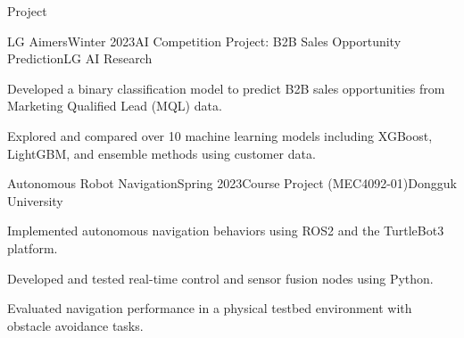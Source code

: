 \begin{rSection}{Project}

\begin{rSubsection}{LG Aimers}{Winter 2023}{AI Competition Project: B2B Sales Opportunity Prediction}{LG AI Research}
  \item Developed a binary classification model to predict B2B sales opportunities from Marketing Qualified Lead (MQL) data.
  \item Explored and compared over 10 machine learning models including XGBoost, LightGBM, and ensemble methods using customer data.
\end{rSubsection}

\begin{rSubsection}{Autonomous Robot Navigation}{Spring 2023}{Course Project (MEC4092-01)}{Dongguk University}
  \item Implemented autonomous navigation behaviors using ROS2 and the TurtleBot3 platform.
  \item Developed and tested real-time control and sensor fusion nodes using Python.
  \item Evaluated navigation performance in a physical testbed environment with obstacle avoidance tasks.
\end{rSubsection}

\end{rSection}

